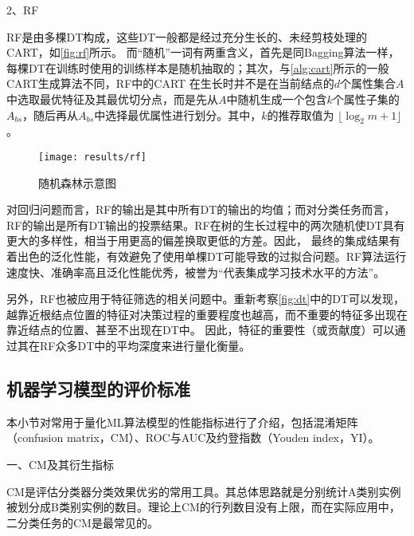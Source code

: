 2、RF

RF是由多棵DT构成，这些DT一般都是经过充分生长的、未经剪枝处理的CART，如\autoref{fig:rf}所示。
而“随机”一词有两重含义，首先是同Bagging算法一样，每棵DT在训练时使用的训练样本是随机抽取的；其次，与\autoref{alg:cart}所示的一般CART生成算法不同，RF中的CART
在生长时并不是在当前结点的$d$个属性集合$A$中选取最优特征及其最优切分点，而是先从$A$中随机生成一个包含$k$个属性子集的$A_{bs}$，随后再从$A_{bs}$中选择最优属性进行划分\cite{Zhou2016,Liu2018,breiman2001}。其中，$k$的推荐取值为
$\lfloor \log_2m + 1 \rfloor$\cite{breiman2001}。

\begin{figure}[htbp]
      \centering
      \texttt{[image: results/rf]}
      \caption{\label{fig:rf}随机森林示意图}
\end{figure}

对回归问题而言，RF的输出是其中所有DT的输出的均值；而对分类任务而言，RF的输出是所有DT输出的投票结果。RF在树的生长过程中的两次随机使DT具有更大的多样性，相当于用更高的偏差换取更低的方差。因此，
最终的集成结果有着出色的泛化性能，有效避免了使用单棵DT可能导致的过拟合问题。RF算法运行速度快、准确率高且泛化性能优秀，被誉为“代表集成学习技术水平的方法”\cite{Zhou2016,Liu2018}。

另外，RF也被应用于特征筛选的相关问题中\cite{Aurélien2018}。重新考察\autoref{fig:dt}中的DT可以发现，越靠近根结点位置的特征对决策过程的重要程度也越高，而不重要的特征多出现在靠近结点的位置、甚至不出现在DT中。
因此，特征的重要性（或贡献度）可以通过其在RF众多DT中的平均深度来进行量化衡量。

\subsection{机器学习模型的评价标准}
本小节对常用于量化ML算法模型的性能指标进行了介绍，包括混淆矩阵（confusion matrix，CM）、ROC与AUC及约登指数（Youden index，YI）。

一、CM及其衍生指标

CM是评估分类器分类效果优劣的常用工具\cite{Zhou2016,Aurélien2018}。其总体思路就是分别统计A类别实例被划分成B类别实例的数目。理论上CM的行列数目没有上限，而在实际应用中，
二分类任务的CM是最常见的。

